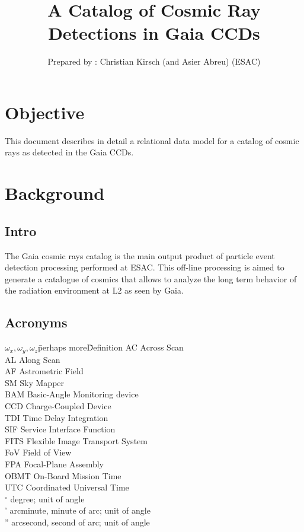 \documentclass[a4paper, 11pt]{article}
\title{A Catalog of Cosmic Ray Detections in Gaia CCDs}
\author{Prepared by : Christian Kirsch (and Asier Abreu) (ESAC)}
\date{\parbox{\linewidth}{\centering%
  \today\endgraf\bigskip\endgraf
  Document Version : \dmVersion}}
\begin{document}
\maketitle
\tableofcontents
\begin{versionhistory}
\end{versionhistory}

\newpage
\section{Objective}
\label{sec:objective}

This document describes in detail a relational data model for a catalog of cosmic rays as detected in the Gaia CCDs. 

\section{Background}

\subsection{Intro}

The Gaia cosmic rays catalog is the main output product of particle event detection processing performed at ESAC. This off-line processing is aimed to generate a catalogue of cosmics that allows to analyze the long term behavior of the radiation environment at L2 as seen by Gaia. 

\subsection{Acronyms}

\begin{tabbing}
$\omega_x,\omega_y,\omega_z$\qquad \= perhaps more\= Definition \kill
AC \> Across Scan\\
AL \> Along Scan\\
AF \> Astrometric Field \\
SM \> Sky Mapper\\
BAM \> Basic-Angle Monitoring device\\ 
CCD \> Charge-Coupled Device \\
TDI \> Time Delay Integration \\
SIF \> Service Interface Function\\
FITS \> Flexible Image Transport System\\   
FoV \> Field of View\\
FPA \> Focal-Plane Assembly\\
OBMT \> On-Board Mission Time\\
UTC \> Coordinated Universal Time\\
$^\circ$ \> degree; unit of angle\\
' \> arcminute, minute of arc; unit of angle\\
'' \> arcsecond, second of arc; unit of angle\\
\end{tabbing}
\end{document}
